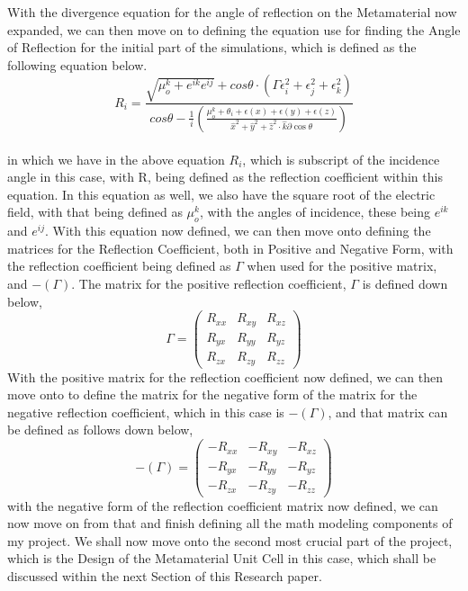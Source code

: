 \documentclass[]{article}
\begin{document}
With the divergence equation for the angle of reflection on the Metamaterial now expanded, we can then move on to defining the equation use for finding the Angle of Reflection for the initial part of the simulations, which is defined as the following equation below.
\\
\begin{equation}
R_i = \frac{\sqrt{\mu_o^k + e^{ik}e^{ij}} + cos\theta \cdot (\Gamma\epsilon_i^2 + \epsilon_j^2 + \epsilon_k^2)}{cos\theta - \frac{1}{i} \left(\frac{\mu_o^k + \theta_i + \epsilon(x) + \epsilon(y) + \epsilon(z)}{\hat{x}^2 +\hat{y}^2+\hat{z}^2 \cdot \hat{k}\partial \cos\theta}\right)}
\end{equation}
\\
in which we have in the above equation $R_i$, which is subscript of the incidence angle in this case, with R, being defined as the reflection coefficient within this equation. In this equation as well, we also have the square root of the electric field, with that being defined as $\mu_o^k$, with the angles of incidence, these being $e^{ik}$ and $e^{ij}$. With this equation now defined, we can then move onto defining the matrices for the Reflection Coefficient, both in Positive and Negative Form, with the reflection coefficient being defined as $\Gamma$ when used for the positive matrix, and $-(\Gamma)$. The matrix for the positive reflection coefficient, $\Gamma$ is defined down below,
\begin{equation} 
\Gamma = 
\left(\begin{array}{ccc}
R_{xx} & R_{xy} & R_{xz}\\
R_{yx} & R_{yy} & R_{yz}\\
R_{zx} & R_{zy} & R_{zz}
\end{array}\right)
\end{equation}
With the positive matrix for the reflection coefficient now defined, we can then move onto to define the matrix for the negative form of the matrix for the negative reflection coefficient, which in this case is $-(\Gamma)$, and that matrix can be defined as follows down below,
\begin{equation}
-(\Gamma) = \left(\begin{array}{ccc}
-R_{xx} & -R_{xy} & -R_{xz}\\
-R_{yx} & -R_{yy} & -R_{yz}\\
-R_{zx} & -R_{zy} & -R_{zz}
\end{array}\right)
\end{equation}
with the negative form of the reflection coefficient matrix now defined, we can now move on from that and finish defining all the math modeling components of my project. We shall now move onto the second most crucial part of the project, which is the Design of the Metamaterial Unit Cell in this case, which shall be discussed within the next Section of this Research paper. 
\end{document}
